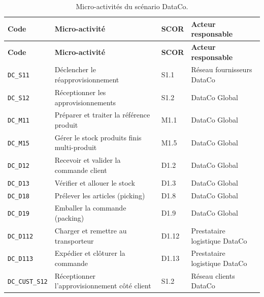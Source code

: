 \documentclass[11pt,a4paper]{article}
\begin{document}
\begin{longtable}{@{}p{1.9cm}p{5.8cm}p{2.0cm}p{3.6cm}@{}}
\caption{Micro-activités du scénario DataCo.}\label{tab:dataco-microactivites}\\
\toprule
\textbf{Code} & \textbf{Micro-activité} & \textbf{SCOR} & \textbf{Acteur responsable} \\
\midrule
\endfirsthead
\toprule
\textbf{Code} & \textbf{Micro-activité} & \textbf{SCOR} & \textbf{Acteur responsable} \\
\midrule
\endhead
\texttt{DC\_S11} & Déclencher le réapprovisionnement & S1.1 & Réseau fournisseurs DataCo \\
\texttt{DC\_S12} & Réceptionner les approvisionnements & S1.2 & DataCo Global \\
\texttt{DC\_M11} & Préparer et traiter la référence produit & M1.1 & DataCo Global \\
\texttt{DC\_M15} & Gérer le stock produits finis multi-produit & M1.5 & DataCo Global \\
\texttt{DC\_D12} & Recevoir et valider la commande client & D1.2 & DataCo Global \\
\texttt{DC\_D13} & Vérifier et allouer le stock & D1.3 & DataCo Global \\
\texttt{DC\_D18} & Prélever les articles (picking) & D1.8 & DataCo Global \\
\texttt{DC\_D19} & Emballer la commande (packing) & D1.9 & DataCo Global \\
\texttt{DC\_D112} & Charger et remettre au transporteur & D1.12 & Prestataire logistique DataCo \\
\texttt{DC\_D113} & Expédier et clôturer la commande & D1.13 & Prestataire logistique DataCo \\
\texttt{DC\_CUST\_S12} & Réceptionner l'approvisionnement côté client & S1.2 & Réseau clients DataCo \\
\bottomrule
\end{longtable}
\end{document}
